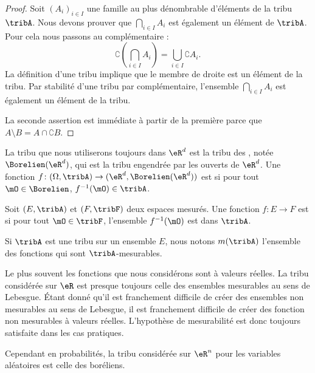 \begin{proof}
    Soit \( (A_i)_{i\in I}\) une famille au plus dénombrable d'éléments de la tribu \( \tribA\). Nous devons prouver que \( \bigcap_{i\in I}A_i\) est également un élément de \( \tribA\). Pour cela nous passons au complémentaire :
    \begin{equation}
        \complement\left( \bigcap_{i\in I}A_i \right)=\bigcup_{i\in I}\complement A_i.
    \end{equation}
    La définition d'une tribu implique que le membre de droite est un élément de la tribu. Par stabilité d'une tribu par complémentaire, l'ensemble \( \bigcap_{i\in I}A_i\) est également un élément de la tribu.

    La seconde assertion est immédiate à partir de la première parce que \( A\setminus B=A\cap \complement B\).
\end{proof}

La tribu que nous utiliserons toujours dans \( \eR^d\) est la tribu des , notée \( \Borelien(\eR^d)\), qui est la tribu engendrée par les ouverts de \( \eR^d\). Une fonction \( f\colon (\Omega,\tribA)\to (\eR^d,\Borelien(\eR^d))\) est  si pour tout \( \mO\in\Borelien\), \( f^{-1}(\mO)\in\tribA\).

\begin{definition}
    Soit \( (E,\tribA)\) et \( (F,\tribF)\) deux espaces mesurés. Une fonction \( f\colon E\to F\) est  si pour tout \( \mO\in \tribF\), l'ensemble \( f^{-1}(\mO)\) est dans \( \tribA\).
\end{definition}
Si \( \tribA\) est une tribu sur un ensemble \( E\), nous notons \( m(\tribA)\) l'ensemble des fonctions qui sont \( \tribA\)-mesurables.

\begin{remark}
    Le plus souvent les fonctions que nous considérons sont à valeurs réelles. La tribu considérée sur \( \eR\) est presque toujours celle des ensembles mesurables au sens de Lebesgue. Étant donné qu'il est franchement difficile de créer des ensembles non mesurables au sens de Lebesgue, il est franchement difficile de créer des fonction non mesurables à valeurs réelles. L'hypothèse de mesurabilité est donc toujours satisfaite dans les cas pratiques.

    Cependant en probabilités, la tribu considérée sur \( \eR^n\) pour les variables aléatoires est celle des boréliens.
\end{remark}

